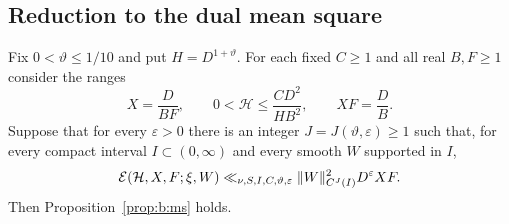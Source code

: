 \subsection{Reduction to the dual mean square}\label{ssec:b:poissonreduction}

\begin{proposition}\label{prop:b:poissonreduction}
Fix $0<\vartheta\le1/10$ and put $H=D^{1+\vartheta}$. For each fixed $C\ge1$ and all real $B,F\ge1$ consider the ranges
\begin{equation}\label{eq:b:initialscales}
  X=\frac D{BF},\qquad0<\mathcal H\le\frac{CD^2}{HB^2},\qquad XF=\frac DB.
\end{equation}
Suppose that for every $\varepsilon>0$ there is an integer $J=J(\vartheta,\varepsilon)\ge1$ such that, for every compact interval $I\subset(0,\infty)$ and every smooth $W$ supported in $I$,
\begin{equation}\label{eq:b:auxtarget}
  \mathcal{E}(\mathcal H,X,F;\xi,W)\ll_{\nu,S,I,C,\vartheta,\varepsilon}\|W\|_{C^J(I)}^2D^\varepsilon XF.
\end{equation}
Then Proposition~\ref{prop:b:ms} holds.
\end{proposition}

